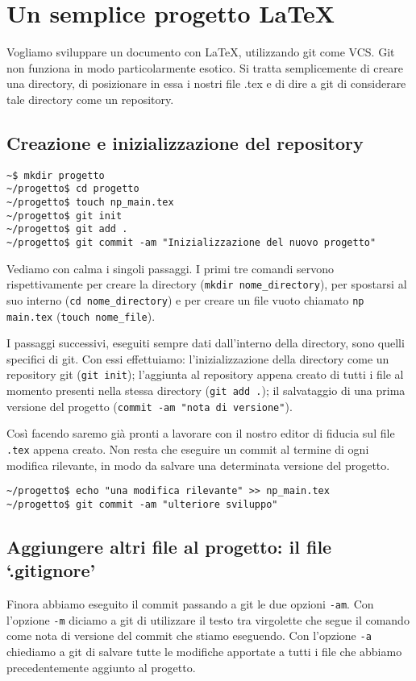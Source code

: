 \documentclass[a4paper,12pt,oneside]{article}
\begin{document}
\section{Un semplice progetto \LaTeX}
Vogliamo sviluppare un documento con \LaTeX, utilizzando git come VCS.
Git non funziona in modo particolarmente esotico. Si tratta semplicemente di
creare una directory, di posizionare in essa i nostri file .tex e di dire a git
di considerare tale directory come un repository.

\subsection{Creazione e inizializzazione del repository}
\begin{lstlisting}
~$ mkdir progetto
~/progetto$ cd progetto
~/progetto$ touch np_main.tex
~/progetto$ git init
~/progetto$ git add .
~/progetto$ git commit -am "Inizializzazione del nuovo progetto"
\end{lstlisting}

Vediamo con calma i singoli passaggi. I primi tre comandi servono
rispettivamente per creare la directory (\lstinline|mkdir nome_directory|),
per spostarsi al suo interno (\lstinline|cd nome_directory|) e per creare
un file vuoto chiamato \lstinline|np main.tex| (\lstinline|touch nome_file|).

I passaggi successivi, eseguiti sempre dati dall'interno della directory, sono
quelli specifici di git. Con essi effettuiamo:
l'inizializzazione della directory come un repository git (\lstinline|git init|);
l'aggiunta al repository appena creato di tutti i file al momento presenti nella
stessa directory (\lstinline|git add .|); il salvataggio di una prima versione
del progetto (\lstinline|commit -am "nota di versione"|).

Così facendo saremo già pronti a lavorare con il nostro editor di fiducia sul
file \lstinline|.tex| appena creato.
Non resta che eseguire un commit al termine di ogni modifica rilevante, in
modo da salvare una determinata versione del progetto.
\begin{lstlisting}
~/progetto$ echo "una modifica rilevante" >> np_main.tex
~/progetto$ git commit -am "ulteriore sviluppo"
\end{lstlisting}

\subsection{Aggiungere altri file al progetto: il file `.gitignore'}
Finora abbiamo eseguito il commit passando a git le due opzioni \lstinline|-am|.
Con l'opzione \lstinline|-m| diciamo a git di utilizzare il testo tra virgolette
che segue il comando come nota di versione del commit che stiamo eseguendo. Con
l'opzione \lstinline|-a| chiediamo a git di salvare tutte le modifiche apportate
a tutti i file che abbiamo precedentemente aggiunto al progetto.
\end{document}
